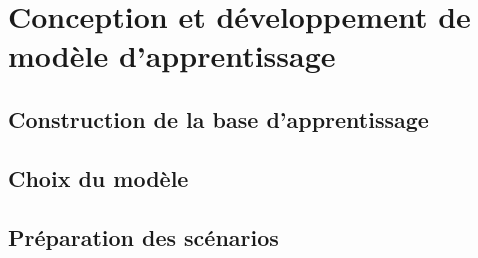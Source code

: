 

\section{Conception et développement de modèle d'apprentissage}

\subsection{Construction de la base d’apprentissage}
   	
\subsection{Choix du modèle}

\subsection{Préparation des scénarios}